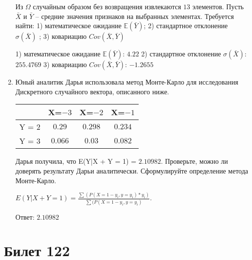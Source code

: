 \documentclass[a4paper,12pt]{article}
\begin{document}
\begin{enumerate}
Из $\Omega$ случайным образом без возвращения извлекаются $13$ элементов. 
Пусть $\bar X$ и $\bar Y$ – средние значения признаков на выбранных элементах. 
Требуется найти: 1) математическое ожидание $\mathbb{E}(\bar Y)$; 2) стандартное отклонение $\sigma(\bar X)$ ; 
3) ковариацию $Cov(\bar X, \bar Y)$




1) математическое ожидание $\mathbb{E}(\bar Y)$: $4.22$ 
2) стандартное отклонение $\sigma(\bar X)$: $255.4769$
3) ковариацию $Cov(\bar X, \bar Y)$: $-1.2655$


\item

    
    	Юный аналитик Дарья использовала метод Монте-Карло для исследования Дискретного случайного вектора, описанного ниже.

        \begin{tabular}{|c|c|c|c|}
	\hline
	& X=$-3$ & X=$-2$ & X=$-1$ \\
	\hline
	Y = $2$ & $0.29$ & $0.298$  &  $0.234$ \\
	\hline
	Y = $3$ & $0.066$ & $0.03$ & $0.082$  \\
	\hline
\end{tabular}

    	Дарья получила, что E(Y|X + Y = 1) = $2.10982$.
    	Проверьте, можно ли доверять результату Дарьи аналитически. Сформулируйте определение метода Монте-Карло.
    


    
        $E(Y|X+Y=1) = \frac{\sum(P(X=1 - y_i, y=y_i) * y_i)}{\sum(P(X=1 - y_i, y=y_i)}$.

        Ответ: $2.10982$
    


\end{enumerate}

\section{Билет 122}
\end{document}
